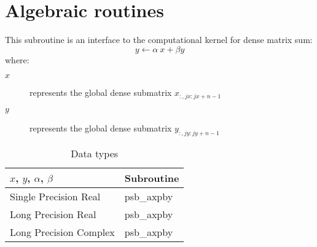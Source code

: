 \section{Algebraic routines}

%
%

This subroutine is an interface to the computational kernel for
dense matrix sum:
\[ y \leftarrow  \alpha\> x+ \beta y \] 
where:
\begin{description}
\item[$x$] represents the global dense submatrix $x_{:, jx:jx+n-1}$
\item[$y$] represents the global dense submatrix $y_{:, jy:jy+n-1}$
\end{description}


\begin{table}[h]
\begin{center}
\begin{tabular}{ll}
\hline
$x$, $y$, $\alpha$, $\beta$ & {\bf Subroutine}\\
\hline
Single Precision Real & psb\_axpby \\
Long Precision Real & psb\_axpby \\
Long Precision Complex & psb\_axpby \\
\hline
\end{tabular}
\end{center}
\caption{Data types\label{tab:f90axpby}}
\end{table}

